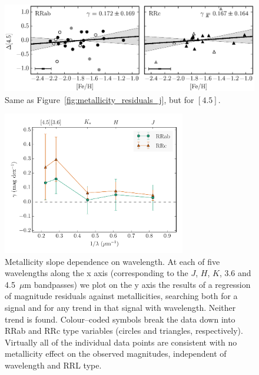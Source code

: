 \documentclass[a4paper,fleqn,usenatbib]{mnras}
\newcommand{\um}{~$\mu$m\xspace}
\begin{document}
\begin{figure}
\begin{center}
\includegraphics[width=160mm]{../ocen_only_fitting/final_plots/metallicity_vs_residuals_4_sigclip.eps}
\caption{Same as Figure~\ref{fig:metallicity_residuals_j}, but for $[4.5]$.}
\label{fig:metallicity_residuals_4}
\end{center}
\end{figure}

\begin{figure}
\begin{center}
\includegraphics[width=80mm, trim=0.75cm 0 0.5cm 0]{../ocen_only_fitting/final_plots/metallicity_slope_vs_wavelength.pdf}
\caption{Metallicity slope dependence on wavelength. At each of five
wavelengths along the x axis (corresponding to the $J$, $H$, $K$, 3.6 and 
4.5\um bandpasses) we plot on the y axis the results of a
regression of magnitude residuals against metallicities, searching
both for a signal and for any trend in that signal with
wavelength. Neither trend is found. Colour--coded symbols break the data
down into RRab and RRc type variables (circles and triangles,
respectively).
Virtually all of the individual data points are consistent with no
metallicity effect on the observed magnitudes, independent of
wavelength and RRL type.}
\label{fig:metallicity_slopes}
\end{center}
\end{figure}
\end{document}
